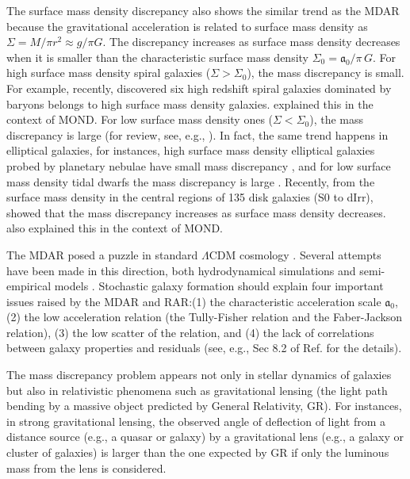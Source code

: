 \documentclass[fleqn,usenatbib,useAMS]{mnras}
\begin{document}
    The surface mass density discrepancy also shows the similar trend as the MDAR because the gravitational acceleration is related to surface mass density as $\Sigma=M/\pi r^2\approx g/\pi G$.
    The discrepancy increases as surface mass density decreases when it is smaller than the characteristic surface mass density $\Sigma_0=\mathfrak{a}_0/\pi\,G$.
    For high surface mass density spiral galaxies ($\Sigma>\Sigma_0$), the mass discrepancy is small.
    For example, recently, \cite{Genzel17} discovered six high redshift spiral galaxies dominated by baryons belongs to high surface mass density galaxies.
    \cite{Milgrom17} explained this in the context of MOND.
    For low surface mass density ones ($\Sigma<\Sigma_0$), the mass discrepancy is large (for review, see, e.g., \cite{SandersMcGaugh,FM12}).
    In fact, the same trend happens in elliptical galaxies, for instances, high surface mass density elliptical galaxies probed by planetary nebulae have small mass discrepancy \citep{Romanowsky03,MS03,TC16}, and for low surface mass density tidal dwarfs the mass discrepancy is large \citep{Gentile07,Milgrom07,Dabringhausen16}.
    Recently, from the surface mass density in the central regions of 135 disk galaxies (S0 to dIrr), \cite{Lelli16} showed that the mass discrepancy increases as surface mass density decreases.
    \cite{Milgrom16} also explained this in the context of MOND.

    The MDAR posed a puzzle in standard $\Lambda$CDM cosmology \citep{WuKroupa15}.
    Several attempts have been made in this direction, both hydrodynamical simulations \citep{WuKroupa15,Ludlow17} and semi-empirical models \citep{DiCintioLelli16, Navarro16,Desmond17}.
    Stochastic galaxy formation should explain four important issues raised by the MDAR and RAR:(1) the characteristic acceleration scale $\mathfrak{a}_0$, (2) the low acceleration relation (the Tully-Fisher relation and the Faber-Jackson relation), (3) the low scatter of the relation, and (4) the lack of correlations between galaxy properties and residuals (see, e.g., Sec 8.2 of Ref. \cite{Lelli17} for the details).

    The mass discrepancy problem appears not only in stellar dynamics of galaxies but also in relativistic phenomena such as gravitational lensing (the light path bending by a massive object predicted by General Relativity, GR).
    For instances, in strong gravitational lensing, the observed angle of deflection of light from a distance source (e.g., a quasar or galaxy) by a gravitational lens (e.g., a galaxy or cluster of galaxies) is larger than the one expected by GR if only the luminous mass from the lens is considered.
\end{document}
